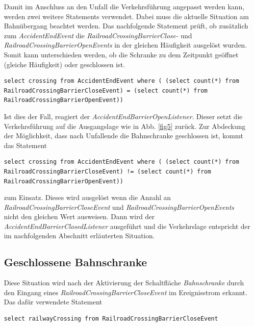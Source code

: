 Damit im Anschluss an den Unfall die Verkehrsführung angepasst werden kann, werden zwei weitere Statements verwendet. Dabei muss die aktuelle Situation am Bahnübergang beachtet werden. Das nachfolgende Statement prüft, ob zusätzlich zum \textit{AccidentEndEvent} die \textit{RailroadCrossingBarrierClose-} und \textit{RailroadCrossingBarrierOpenEvents} in der gleichen Häufigkeit ausgelöst wurden. Somit kann unterschieden werden, ob die Schranke zu dem Zeitpunkt geöffnet (gleiche Häufigkeit) oder geschlossen ist. 

\begin{lstlisting}
select crossing from AccidentEndEvent where ( (select count(*) from RailroadCrossingBarrierCloseEvent) = (select count(*) from RailroadCrossingBarrierOpenEvent))
\end{lstlisting}

Ist dies der Fall, reagiert der \textit{AccidentEndBarrierOpenListener}. Dieser setzt die Verkehrsführung auf die Ausgangslage wie in Abb. \ref{fig5} zurück. Zur Abdeckung der Möglichkeit, dass nach Unfallende die Bahnschranke geschlossen ist, kommt das Statement

\begin{lstlisting}
select crossing from AccidentEndEvent where ( (select count(*) from RailroadCrossingBarrierCloseEvent) != (select count(*) from RailroadCrossingBarrierOpenEvent))
\end{lstlisting}

zum Einsatz. Dieses wird ausgelöst wenn die Anzahl an \textit{RailroadCrossingBarrierCloseEvent} und \textit{RailroadCrossingBarrierOpenEvents} nicht den gleichen Wert ausweisen. Dann wird der \textit{AccidentEndBarrierClosedListener} ausgeführt und die Verkehrslage entspricht der im nachfolgenden Abschnitt erläuterten Situation.

\subsection{Geschlossene Bahnschranke} \label{closedBarrier}

Diese Situation wird nach der Aktivierung der Schaltfläche \textit{Bahnschranke} durch den Eingang eines \textit{RailroadCrossingBarrierCloseEvent} im Ereignisstrom  erkannt. Das dafür verwendete Statement

\begin{lstlisting}
select railwayCrossing from RailroadCrossingBarrierCloseEvent
\end{lstlisting}


